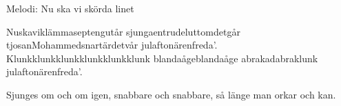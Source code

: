 \begin{song}


\begin{songmeta}
Melodi: Nu ska vi skörda linet
\end{songmeta}

\begin{songtext}
Nuskaviklämmaseptengutår
sjungaentrudeluttomdetgår
tjosanMohammedsnartärdetvår
julaftonärenfreda'.
Klunkklunkklunkklunkklunkklunk
blandaågeblandaåge
abrakadabraklunk
julaftonärenfreda'.
\end{songtext}

\begin{songnotes}
Sjunges om och om igen, snabbare och snabbare, så länge man orkar och kan.
\end{songnotes}

\end{song}
